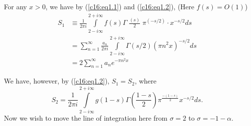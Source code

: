 \medskip
{}
For any $x>0$, we have by (\ref{c16:eq1.1}) and (\ref{c16:eq1.2}), (Here $f(s)=O(1)$)
\begin{align*}
S_1 & \equiv \frac{1}{2\pi i} \int\limits^{2+i\infty}_{2-i\infty} f(s)
\Gamma \; \frac{(s)}{2} \;  \pi^{(-s/2)} \cdot x^{-s/2} ds\\
& = \sum\limits^\infty_{n=1} \frac{a_n}{2\pi i}
\int\limits^{2+i\infty}_{2-i\infty} \Gamma(s/2) (\pi n^2 x)^{-s/2}
ds\\
& = 2 \sum\limits^\infty_{n=1} a_n e^{-\pi n^2x}
\end{align*}

We have, however, by (\ref{c16:eq1.2}), $S_1 = S_2$, where 
$$
S_2 = \frac{1}{2\pi i} \int\limits^{2+i\infty}_{2-i\infty} g(1-s) 
\Gamma \left(\frac{1-s}{2} \right)  \pi^{\frac{-(1-s)}{2}} x^{-s/2} ds.
$$\pageoriginale
Now we wish to move the line of integration here from $\sigma =2$ to
$\sigma = -1-\alpha$.

